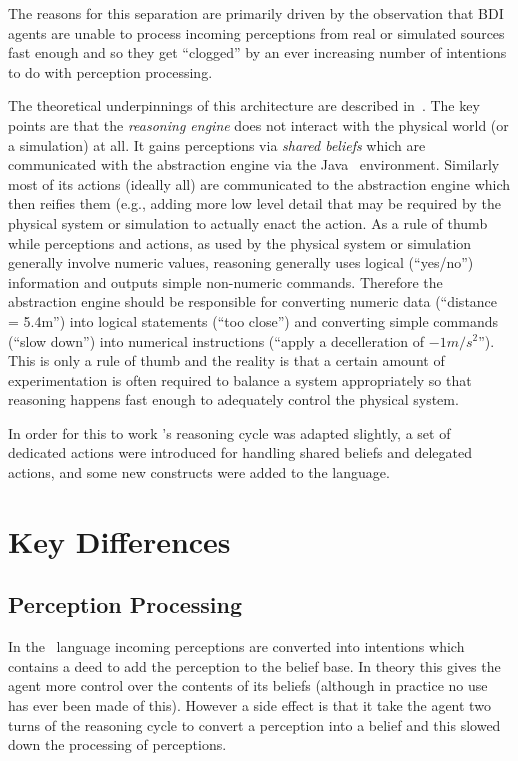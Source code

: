 \documentclass[a4]{article}
\begin{document}
The reasons for this separation are primarily driven by the observation that BDI agents are unable to process incoming perceptions from real or simulated sources fast enough and so they get ``clogged'' by an ever increasing number of intentions to do with perception processing.  

The theoretical underpinnings of this architecture are described in~\cite{DALT10:abstraction}.  The key points are that the \emph{reasoning engine} does not interact with the physical world (or a simulation) at all.  It gains perceptions via \emph{shared beliefs} which are communicated with the abstraction engine via the Java \eass\ environment.  Similarly most of its actions (ideally all) are communicated to the abstraction engine which then reifies them (e.g., adding more low level detail that may be required by the physical system or simulation to actually enact the action.  As a rule of thumb while perceptions and actions, as used by the physical system or simulation generally involve numeric values, reasoning generally uses logical (``yes/no'') information and outputs simple non-numeric commands.  Therefore the abstraction engine should be responsible for converting numeric data (``distance = 5.4m'') into logical statements (``too close'') and converting simple commands (``slow down'') into numerical instructions (``apply a decelleration of $-1m/s^2$'').  This is only a rule of thumb and the reality is that a certain amount of experimentation is often required to balance a system appropriately so that reasoning happens fast enough to adequately control the physical system.

In order for this to work \gwendolen's reasoning cycle was adapted slightly, a set of dedicated actions were introduced for handling shared beliefs and delegated actions, and some new constructs were added to the language.

\section{Key Differences}
\subsection{Perception Processing}
In the \gwendolen\ language incoming perceptions are converted into intentions which contains a deed to add the perception to the belief base.  In theory this gives the agent more control over the contents of its beliefs (although in practice no use has ever been made of this).  However a side effect is that it take the agent two turns of the reasoning cycle to convert a perception into a belief and this slowed down the processing of perceptions.
\end{document}
